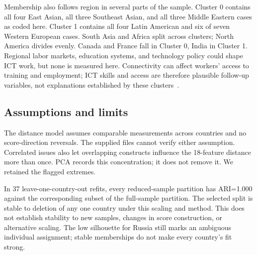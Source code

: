 \documentclass[9pt,twocolumn]{extarticle}
\begin{document}
Membership also follows region in several parts of the sample. Cluster 0 contains all four East Asian, all three Southeast Asian, and all three Middle Eastern cases as coded here. Cluster 1 contains all four Latin American and six of seven Western European cases. South Asia and Africa split across clusters; North America divides evenly. Canada and France fall in Cluster 0, India in Cluster 1. Regional labor markets, education systems, and technology policy could shape ICT work, but none is measured here. Connectivity can affect workers' access to training and employment; ICT skills and access are therefore plausible follow-up variables, not explanations established by these clusters~\cite{wbaccess,itu}.

\subsection{Assumptions and limits}
The distance model assumes comparable measurements across countries and no score-direction reversals. The supplied files cannot verify either assumption. Correlated issues also let overlapping constructs influence the 18-feature distance more than once. PCA records this concentration; it does not remove it. We retained the flagged extremes.

In 37 leave-one-country-out refits, every reduced-sample partition has ARI=1.000 against the corresponding subset of the full-sample partition. The selected split is stable to deletion of any one country under this scaling and method. This does not establish stability to new samples, changes in score construction, or alternative scaling. The low silhouette for Russia still marks an ambiguous individual assignment; stable memberships do not make every country's fit strong.
\end{document}
